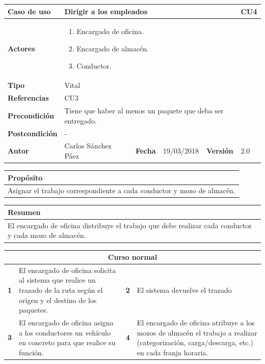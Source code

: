 \documentclass[12pt,spanish]{article}
\begin{document}
\begin{table}[H]
\centering
\begin{tabular}{|m{3cm}|m{4cm}|m{2cm}|m{2cm}|m{2cm}|m{1cm}|}
\hline
\textbf{Caso de uso} &  \multicolumn{4}{m{8cm}|}{Dirigir a los empleados} \vline &  \cellcolor{gray!40}CU4 \\
\hline
\textbf{Actores} & \multicolumn{5}{m{8cm}|}{\begin{enumerate}
\item Encargado de oficina.
\item Encargado de almacén.
\item Conductor.
\end{enumerate}} \\
\hline
\textbf{Tipo} & \multicolumn{5}{m{8cm}|}{Vital} \\
\hline
\textbf{Referencias} &\multicolumn{5}{m{8cm}|}{CU3} \\
\hline
\textbf{Precondición} & \multicolumn{5}{m{8cm}|}{Tiene que haber al menos un paquete que deba ser entregado.} \\
\hline
\textbf{Postcondición} & \multicolumn{5}{m{8cm}|}{-} \\
\hline
\textbf{Autor} & Carlos Sánchez Páez & \textbf{Fecha} & 19/03/2018 & \textbf{Versión} & 2.0 \\
\hline
\end{tabular}

\vspace{1cm}

\begin{tabular}{|m{16.2cm}|}
\hline
\textbf{Propósito} \\
\hline
Asignar el trabajo correspondiente a cada conductor y mozo de almacén. \\
\hline
\end{tabular}

\vspace{1cm}

\begin{tabular}{|m{16.2cm}|}
\hline
\textbf{Resumen} \\
\hline
El encargado de oficina distribuye el trabajo que debe realizar cada conductor y cada mozo de almacén. \\
\hline
\end{tabular}

\vspace{1cm}

\begin{tabular}{|m{4pt}|m{7.33cm}|m{4pt}|m{7.33cm}|}
\hline
\multicolumn{4}{|c|}{\textbf{Curso normal}} \\
\hline
\textbf{1} & El encargado de oficina solicita al sistema que realice un trazado de la ruta según el origen y el destino de los paquetes. & \textbf{2} & El sistema devuelve el trazado \\
\hline
\textbf{3} & El encargado de oficina asigna a los conductores un vehículo en concreto para que realice su función. & \textbf{4} & El encargado de oficina atribuye a los mozos de almacén el trabajo a realizar (categorización, carga/descarga, etc.) en cada franja horaria. \\
\hline
\end{tabular}


\end{table}
\end{document}
